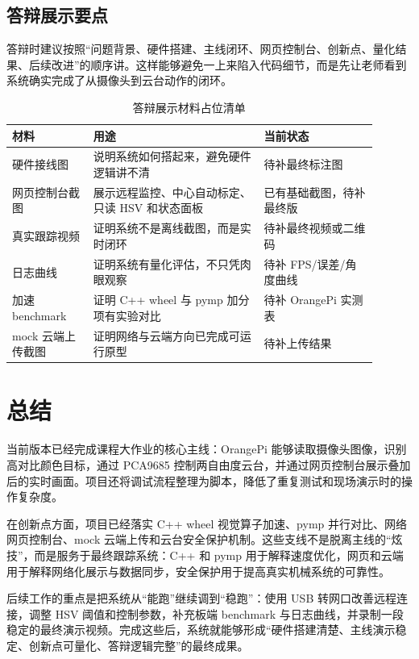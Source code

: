 \documentclass[
  oneside,
  degree=bachelor,
  field=science,
  fullwidthstop=circle,
  fontset=windows,
  times=false,
  minted=false,
  biblatex=false,
  algo=algpseudocode,
]{tongjithesis}
\begin{document}
\section{答辩展示要点}

答辩时建议按照“问题背景、硬件搭建、主线闭环、网页控制台、创新点、量化结果、后续改进”的顺序讲。这样能够避免一上来陷入代码细节，而是先让老师看到系统确实完成了从摄像头到云台动作的闭环。

\begin{table}[htbp]
  \centering
  \caption{答辩展示材料占位清单}
  \label{tab:defense-materials}
  \footnotesize
  \setlength{\tabcolsep}{4pt}
  \begin{tabular}{p{0.20\linewidth}p{0.42\linewidth}p{0.28\linewidth}}
    \toprule
    材料 & 用途 & 当前状态 \\
    \midrule
    硬件接线图 & 说明系统如何搭起来，避免硬件逻辑讲不清 & 待补最终标注图 \\
    网页控制台截图 & 展示远程监控、中心自动标定、只读 HSV 和状态面板 & 已有基础截图，待补最终版 \\
    真实跟踪视频 & 证明系统不是离线截图，而是实时闭环 & 待补最终视频或二维码 \\
    日志曲线 & 证明系统有量化评估，不只凭肉眼观察 & 待补 FPS/误差/角度曲线 \\
    加速 benchmark & 证明 C++ wheel 与 pymp 加分项有实验对比 & 待补 OrangePi 实测表 \\
    mock 云端上传截图 & 证明网络与云端方向已完成可运行原型 & 待补上传结果 \\
    \bottomrule
  \end{tabular}
\end{table}

\chapter{总结}

当前版本已经完成课程大作业的核心主线：OrangePi 能够读取摄像头图像，识别高对比颜色目标，通过 PCA9685 控制两自由度云台，并通过网页控制台展示叠加后的实时画面。项目还将调试流程整理为脚本，降低了重复测试和现场演示时的操作复杂度。

在创新点方面，项目已经落实 C++ wheel 视觉算子加速、pymp 并行对比、网络网页控制台、mock 云端上传和云台安全保护机制。这些支线不是脱离主线的“炫技”，而是服务于最终跟踪系统：C++ 和 pymp 用于解释速度优化，网页和云端用于解释网络化展示与数据同步，安全保护用于提高真实机械系统的可靠性。

后续工作的重点是把系统从“能跑”继续调到“稳跑”：使用 USB 转网口改善远程连接，调整 HSV 阈值和控制参数，补充板端 benchmark 与日志曲线，并录制一段稳定的最终演示视频。完成这些后，系统就能够形成“硬件搭建清楚、主线演示稳定、创新点可量化、答辩逻辑完整”的最终成果。
\end{document}
